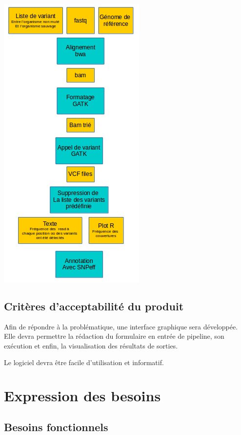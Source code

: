 \documentclass[12pt]{article}
\begin{document}
\begin{center} \includegraphics[scale=0.8]{schemaPipeline.png} \end{center}

\subsection{Critères d'acceptabilité du produit}

Afin de répondre à la problématique, une interface graphique sera développée. Elle devra permettre la rédaction du formulaire en entrée de pipeline, son exécution et enfin, la visualisation des résultats de sorties.

Le logiciel devra être facile d'utilisation et informatif.

\section{Expression des besoins}
\subsection{Besoins fonctionnels}

\newpage
\end{document}
